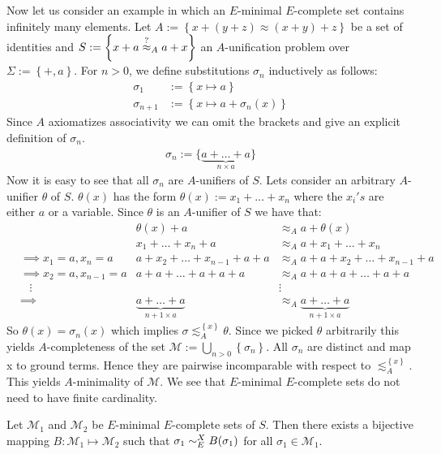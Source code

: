 Now let us consider an example in which an $E$-minimal $E$-complete set contains infinitely many elements. Let $A:=\left\lbrace x+(y+z)\approx (x+y)+z\right\rbrace $ be a set of identities and $S:=\left\lbrace x+a\stackrel{?}{\approx}_A a+x\right\rbrace$ an $A$-unification problem over $\Sigma:=\left\lbrace +,a\right\rbrace$. For $n>0$, we define substitutions $\sigma_n$ inductively as follows:
\begin{align*}
\sigma_1&:=\left\lbrace x\mapsto a\right\rbrace\\
\sigma_{n+1}&:=\left\lbrace x\mapsto a+\sigma_n(x)\right\rbrace
\end{align*}
Since $A$ axiomatizes associativity we can omit the brackets and give an explicit definition of $\sigma_n$.
\begin{align*}
\sigma_n:=\lbrace\underbrace{a+\dots+a}_{n\times a} \rbrace
\end{align*}
Now it is easy to see that all $\sigma_n$ are $A$-unifiers of $S$.
Lets consider an arbitrary $A$-unifier $\theta$ of $S$. $\theta(x)$ has the form $\theta(x):=x_1+\dots+x_n$ where the $x_i's$ are either $a$ or a variable.
Since $\theta$ is an $A$-unifier of $S$ we have that:
\begin{align*}
&&\theta(x)+a&\approx_A a+\theta(x)\\
&& x_1+\dots+x_n+a&\approx_A a+x_1+\dots+x_n\\
&\implies x_1=a,x_n=a& a+x_2+\dots+x_{n-1}+a+a&\approx_A a+a+x_2+\dots+x_{n-1}+a\\
&\implies x_2=a,x_{n-1}=a& a+a+\dots+a+a+a&\approx_A a+a+a+\dots+a+a\\
&\hspace{10pt}\vdots&&\vdots\\
&\implies&\underbrace{a+\dots+a}_{n+1\times a}&\approx_A \underbrace{a+\dots+a}_{n+1\times a}
\end{align*}
So $\theta(x)=\sigma_n(x)$ which implies $\sigma\lesssim^{\left\lbrace x\right\rbrace }_A\theta$.
Since we picked $\theta$ arbitrarily this yields $A$-completeness of the set $\mathcal{M}:=\bigcup_{n>0}\left\lbrace  \sigma_n\right\rbrace $.
All $\sigma_n$ are distinct and map x to ground terms. Hence they are pairwise incomparable with respect to $\lesssim^{\left\lbrace x\right\rbrace }_A$. This yields $A$-minimality of $\mathcal{M}$.
We see that $E$-minimal $E$-complete sets do not need to have finite cardinality.
\begin{lemma}
Let $\mathcal{M}_1$ and $\mathcal{M}_2$ be $E$-minimal $E$-complete sets of $S$. Then there exists a bijective mapping $B:\mathcal{M}_1\mapsto\mathcal{M}_2$ such that $\sigma_1\sim^X_E B(\sigma_1)$ for all $\sigma_1\in\mathcal{M}_1$.
\end{lemma}
